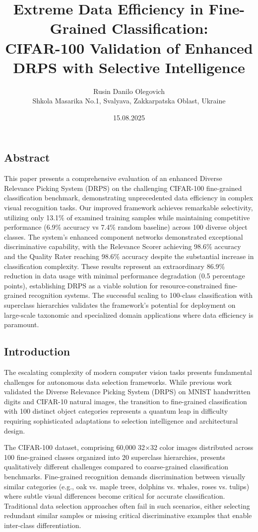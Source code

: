 \documentclass[12pt]{article}
\title{Extreme Data Efficiency in Fine-Grained Classification: \\CIFAR-100 Validation of Enhanced DRPS with Selective Intelligence}
\author{Rusin Danilo Olegovich\\Shkola Masarika No.1, Svalyava, Zakkarpatska Oblast, Ukraine}
\date{15.08.2025}
\begin{document}
\maketitle

\subsection{Abstract}\label{abstract}

This paper presents a comprehensive evaluation of an enhanced Diverse Relevance Picking System (DRPS) on the challenging CIFAR-100 fine-grained classification benchmark, demonstrating unprecedented data efficiency in complex visual recognition tasks. Our improved framework achieves remarkable selectivity, utilizing only 13.1\% of examined training samples while maintaining competitive performance (6.9\% accuracy vs 7.4\% random baseline) across 100 diverse object classes. The system's enhanced component networks demonstrated exceptional discriminative capability, with the Relevance Scorer achieving 98.6\% accuracy and the Quality Rater reaching 98.6\% accuracy despite the substantial increase in classification complexity. These results represent an extraordinary 86.9\% reduction in data usage with minimal performance degradation (0.5 percentage points), establishing DRPS as a viable solution for resource-constrained fine-grained recognition systems. The successful scaling to 100-class classification with superclass hierarchies validates the framework's potential for deployment on large-scale taxonomic and specialized domain applications where data efficiency is paramount.

\subsection{Introduction}\label{introduction}

The escalating complexity of modern computer vision tasks presents fundamental challenges for autonomous data selection frameworks. While previous work validated the Diverse Relevance Picking System (DRPS) on MNIST handwritten digits and CIFAR-10 natural images, the transition to fine-grained classification with 100 distinct object categories represents a quantum leap in difficulty requiring sophisticated adaptations to selection intelligence and architectural design.

The CIFAR-100 dataset, comprising 60,000 32×32 color images distributed across 100 fine-grained classes organized into 20 superclass hierarchies, presents qualitatively different challenges compared to coarse-grained classification benchmarks. Fine-grained recognition demands discrimination between visually similar categories (e.g., oak vs. maple trees, dolphins vs. whales, roses vs. tulips) where subtle visual differences become critical for accurate classification. Traditional data selection approaches often fail in such scenarios, either selecting redundant similar samples or missing critical discriminative examples that enable inter-class differentiation.
\end{document}
